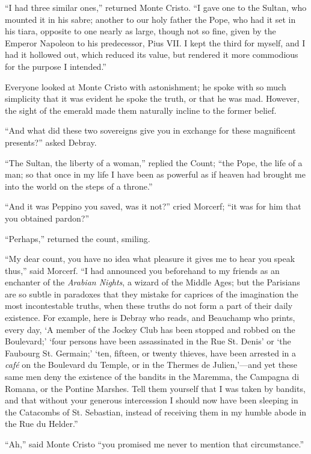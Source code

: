 “I had three similar ones,” returned Monte Cristo. “I gave one to the
Sultan, who mounted it in his sabre; another to our holy father the
Pope, who had it set in his tiara, opposite to one nearly as large,
though not so fine, given by the Emperor Napoleon to his predecessor,
Pius VII. I kept the third for myself, and I had it hollowed out, which
reduced its value, but rendered it more commodious for the purpose I
intended.”

Everyone looked at Monte Cristo with astonishment; he spoke with so
much simplicity that it was evident he spoke the truth, or that he was
mad. However, the sight of the emerald made them naturally incline to
the former belief.

“And what did these two sovereigns give you in exchange for these
magnificent presents?” asked Debray.

“The Sultan, the liberty of a woman,” replied the Count; “the Pope, the
life of a man; so that once in my life I have been as powerful as if
heaven had brought me into the world on the steps of a throne.”

“And it was Peppino you saved, was it not?” cried Morcerf; “it was for
him that you obtained pardon?”

“Perhaps,” returned the count, smiling.

“My dear count, you have no idea what pleasure it gives me to hear you
speak thus,” said Morcerf. “I had announced you beforehand to my
friends as an enchanter of the \textit{Arabian Nights}, a wizard of the Middle
Ages; but the Parisians are so subtle in paradoxes that they mistake
for caprices of the imagination the most incontestable truths, when
these truths do not form a part of their daily existence. For example,
here is Debray who reads, and Beauchamp who prints, every day, ‘A
member of the Jockey Club has been stopped and robbed on the
Boulevard;’ ‘four persons have been assassinated in the Rue St. Denis’
or ‘the Faubourg St. Germain;’ ‘ten, fifteen, or twenty thieves, have
been arrested in a \textit{café} on the Boulevard du Temple, or in the Thermes
de Julien,’—and yet these same men deny the existence of the bandits in
the Maremma, the Campagna di Romana, or the Pontine Marshes. Tell them
yourself that I was taken by bandits, and that without your generous
intercession I should now have been sleeping in the Catacombs of St.
Sebastian, instead of receiving them in my humble abode in the Rue du
Helder.”

“Ah,” said Monte Cristo “you promised me never to mention that
circumstance.”

